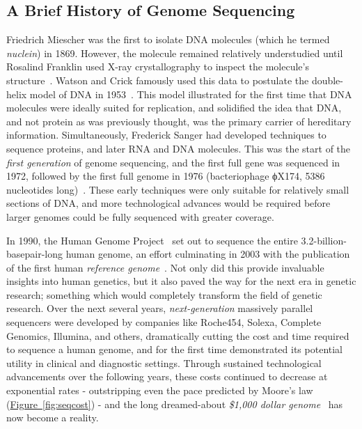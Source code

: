 \begin{justify}
\subsection{A Brief History of Genome Sequencing}
Friedrich Miescher was the first to isolate DNA molecules (which he termed \emph{nuclein}) in 1869. However, the molecule remained relatively understudied until Rosalind Franklin used X-ray crystallography to inspect the molecule's structure~\cite{elkin2003rosalind}. Watson and Crick famously used this data to postulate the double-helix model of DNA in 1953~\cite{watson1953molecular}. This model illustrated for the first time that DNA molecules were ideally suited for replication, and solidified the idea that DNA, and not protein as was previously thought, was the primary carrier of hereditary information. Simultaneously, Frederick Sanger had developed techniques to sequence proteins, and later RNA and DNA molecules. This was the start of the \emph{first generation} of genome sequencing, and the first full gene was sequenced in 1972, followed by the first full genome in 1976 (bacteriophage ϕX174, 5386 nucleotides long)~\cite{sanger1977dna}. These early techniques were only suitable for relatively small sections of DNA, and more technological advances would be required before larger genomes could be fully sequenced with greater coverage.

In 1990, the Human Genome Project~\cite{olson1993human} set out to sequence the entire 3.2-billion-basepair-long human genome, an effort culminating in 2003 with the publication of the first human \textit{reference genome}~\cite{international2004finishing}. Not only did this provide invaluable insights into human genetics, but it also paved the way for the next era in genetic research; something which would completely transform the field of genetic research. Over the next several years, \emph{next-generation} massively parallel sequencers were developed by companies like Roche454, Solexa, Complete Genomics, Illumina, and others, dramatically cutting the cost and time required to sequence a human genome, and for the first time demonstrated its potential utility in clinical and diagnostic settings. Through sustained technological advancements over the following years, these costs continued to decrease at exponential rates - outstripping even the pace predicted by Moore's law (\hyperref[fig:seqcost]{Figure~\ref{fig:seqcost}}) - and the long dreamed-about \textit{\$1,000 dollar genome}~\cite{thousanddollargenome, sequencingcostsNHGRI} has now become a reality.


\end{justify}
